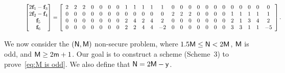 \documentclass[conference,letterpaper]{IEEEtran}
\begin{document}
\begin{figure} [ht]
\begin{equation} \label{eq:scheme 3 transmission of first class}
\begin{aligned}
\begin{bmatrix}
 2{{\bf f}}_1 - {{\bf f}}_3 \\ 
 2{{\bf f}}_2 - {{\bf f}}_4 \\ 
 {{\bf f}}_5 \\ 
 {{\bf f}}_6 
\end{bmatrix} = 
 \left[
\begin{array}{cccccccccccccccccccccccc}
 2 & 2 & 2 & 0 & 0 & 0 & 0 & 1 & 1 & 1 & 1 & 1 & 0 & 0 & 0 & 0 & 0 & 0 & 0 & 0 & 0 & 0 & 0 & 0 \\
 0 & 0 & 0 & 0 & 0 & 0 & 0 & 0 & 0 & 0 & 0 & 0 & 2 & 2 & 2 & 0 & 0 & 0 & 0 & 1 & 1 & 1 & 1 & 1 \\
 0 & 0 & 0 & 0 & 0 & 0 & 0 & 2 & 4 & 2 & 4 & 2 & 0 & 0 & 0 & 0 & 0 & 0 & 0 & 2 & 1 & 3 & 4 & 2 \\
 0 & 0 & 0 & 0 & 0 & 0 & 0 & 2 & 2 & 4 & 4 & -2 & 0 & 0 & 0 & 0 & 0 & 0 & 0 & 3 & 3 & 1 & 1 & -5
\end{array}
 \right].
\end{aligned}
\end{equation}

\end{figure}
\fi
We now consider the $({\sf N}, {\sf M})$ non-secure problem, where $1.5 {\sf M} \leq {\sf N} < 2{\sf M}$, ${\sf M}$ is odd, and ${\sf M} \geq 2{\sf m} + 1$. Our goal is to construct a scheme (Scheme~3) to prove~\eqref{eq:M is odd}.
We also define that ${\sf N}=2{\sf M}-{\sf y}$. 
\end{document}
